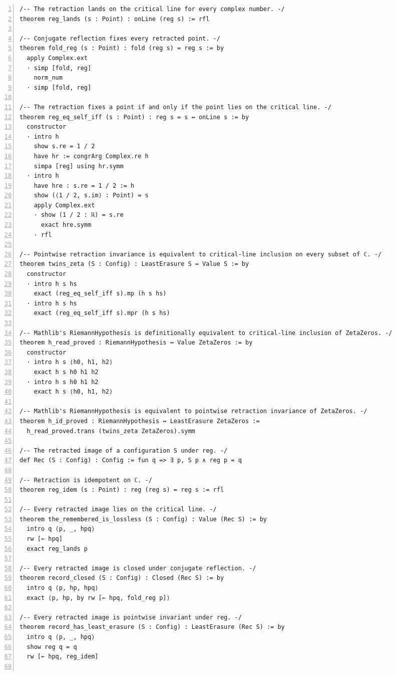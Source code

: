 \documentclass[10pt]{article}
\newcommand{\leansize}{\fontsize{5.5pt}{6.75pt}\selectfont}
\begin{document}
\begin{multicols}{2}
\begin{Verbatim}[numbers=left,firstnumber=1,numbersep=3pt,xleftmargin=2.6em,breaklines=true,breakanywhere=true,breakautoindent=false,breakindent=1.4em,breaksymbolleft={},breakanywheresymbolpre={},fontsize=\leansize]
/-- The retraction lands on the critical line for every complex number. -/
theorem reg_lands (s : Point) : onLine (reg s) := rfl

/-- Conjugate reflection fixes every retracted point. -/
theorem fold_reg (s : Point) : fold (reg s) = reg s := by
  apply Complex.ext
  · simp [fold, reg]
    norm_num
  · simp [fold, reg]

/-- The retraction fixes a point if and only if the point lies on the critical line. -/
theorem reg_eq_self_iff (s : Point) : reg s = s ↔ onLine s := by
  constructor
  · intro h
    show s.re = 1 / 2
    have hr := congrArg Complex.re h
    simpa [reg] using hr.symm
  · intro h
    have hre : s.re = 1 / 2 := h
    show (⟨1 / 2, s.im⟩ : Point) = s
    apply Complex.ext
    · show (1 / 2 : ℝ) = s.re
      exact hre.symm
    · rfl

/-- Pointwise retraction invariance is equivalent to critical-line inclusion on every subset of ℂ. -/
theorem twins_zeta (S : Config) : LeastErasure S ↔ Value S := by
  constructor
  · intro h s hs
    exact (reg_eq_self_iff s).mp (h s hs)
  · intro h s hs
    exact (reg_eq_self_iff s).mpr (h s hs)

/-- Mathlib's RiemannHypothesis is definitionally equivalent to critical-line inclusion of ZetaZeros. -/
theorem h_read_proved : RiemannHypothesis ↔ Value ZetaZeros := by
  constructor
  · intro h s ⟨h0, h1, h2⟩
    exact h s h0 h1 h2
  · intro h s h0 h1 h2
    exact h s ⟨h0, h1, h2⟩

/-- Mathlib's RiemannHypothesis is equivalent to pointwise retraction invariance of ZetaZeros. -/
theorem h_id_proved : RiemannHypothesis ↔ LeastErasure ZetaZeros :=
  h_read_proved.trans (twins_zeta ZetaZeros).symm

/-- The retracted image of a configuration S under reg. -/
def Rec (S : Config) : Config := fun q => ∃ p, S p ∧ reg p = q

/-- Retraction is idempotent on ℂ. -/
theorem reg_idem (s : Point) : reg (reg s) = reg s := rfl

/-- Every retracted image lies on the critical line. -/
theorem the_remembered_is_lossless (S : Config) : Value (Rec S) := by
  intro q ⟨p, _, hpq⟩
  rw [← hpq]
  exact reg_lands p

/-- Every retracted image is closed under conjugate reflection. -/
theorem record_closed (S : Config) : Closed (Rec S) := by
  intro q ⟨p, hp, hpq⟩
  exact ⟨p, hp, by rw [← hpq, fold_reg p]⟩

/-- Every retracted image is pointwise invariant under reg. -/
theorem record_has_least_erasure (S : Config) : LeastErasure (Rec S) := by
  intro q ⟨p, _, hpq⟩
  show reg q = q
  rw [← hpq, reg_idem]


\end{Verbatim}
\end{multicols}
\end{document}
